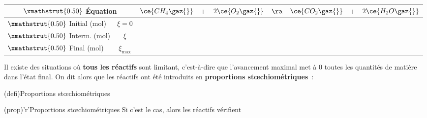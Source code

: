 \documentclass[../../main/main.tex]{subfiles}
\begin{document}
\begin{center}
	\def\rhgt{0.50}
	\centering
	\begin{tabularx}{\linewidth}{|l|c|YdYdYdY|}
		\hline
		\multicolumn{2}{|c|}{
			$\xmathstrut{\rhgt}$
		\textbf{Équation}} &
		$\ce{CH_4\gaz{}}$  & $+$          &
		$2\ce{O_2\gaz{}}$  & $\ra$        &
		$\ce{CO_2\gaz{}}$  & $+$          &
		$2\ce{H_2O\gaz{}}$                  \\
		\hline
		$\xmathstrut{\rhgt}$
		Initial (\si{mol}) & $\xi = 0$    &
		          & \vline       &
		          & \vline       &
		          & \vline       &
		                           \\
		\hline
		$\xmathstrut{\rhgt}$
		Interm. (\si{mol}) & $\xi$        &
		    & \vline       &
		   & \vline       &
		    & \vline       &
		                    \\
		\hline
		$\xmathstrut{\rhgt}$
		Final (\si{mol})   & $\xi_{\max}$ &
		  & \vline       &
		    & \vline       &
		  & \vline       &
		                     \\
		\hline
	\end{tabularx}
\end{center}

Il existe des situations où \textbf{tous les réactifs} sont limitant,
c'est-à-dire que l'avancement maximal met à $0$ toutes les quantités de matière
dans l'état final. On dit alors que les réactifs ont été introduits en
\textbf{proportions stœchiométriques}~:

\begin{tcbraster}[raster columns=2, raster equal height=rows]
	\begin{tcb}[label=def:propsto, cnt, bld](defi){Proportions stœchiométriques}
	\end{tcb}
	\begin{tcb}(prop)'r'{Proportions stœchiométriques}
		Si c'est le cas, alors les réactifs vérifient
		\vspace{-15pt}
	\end{tcb}
\end{tcbraster}
\end{document}
